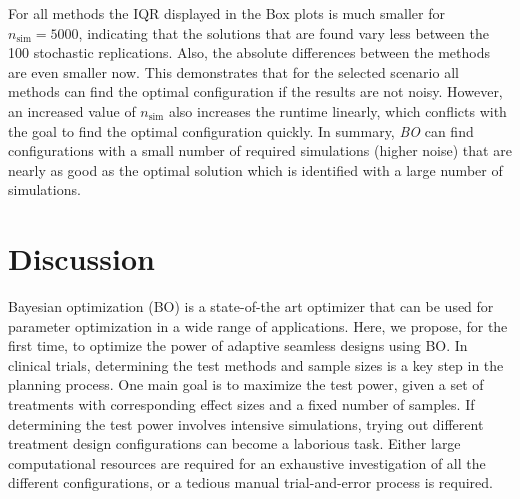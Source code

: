 \documentclass[bimj,fleqn]{w-art}
\theoremstyle{plain}
\theoremstyle{definition}
\begin{document}
For all methods the IQR displayed in the Box plots is much smaller for $n_\text{sim} = 5000$, indicating that the solutions that are found vary less between the 100 stochastic replications.
Also, the absolute differences between the methods are even smaller now.
This demonstrates that for the selected scenario all methods can find the optimal configuration if the results are not noisy.
However, an increased value of $n_\text{sim}$ also increases the runtime linearly, which conflicts with the goal to find the optimal configuration quickly.
In summary, \emph{BO} can find configurations with a small number of required simulations (higher noise) that are nearly as good as the optimal solution which is identified with a large number of simulations.





\section{Discussion}
\label{sec:discussion}

Bayesian optimization (BO) is a state-of-the art optimizer that can be used for parameter optimization in a wide range of applications.
Here, we propose, for the first time, to optimize the power of adaptive seamless designs using BO.
In clinical trials, determining the test methods and sample sizes is a key step in the planning process.
One main goal is to maximize the test power, given a set of treatments with corresponding effect sizes and a fixed number of samples.
If determining the test power involves intensive simulations, trying out different treatment design configurations can become a laborious task.
Either large computational resources are required for an exhaustive investigation of all the different configurations, or a tedious manual trial-and-error process is required.
\end{document}
